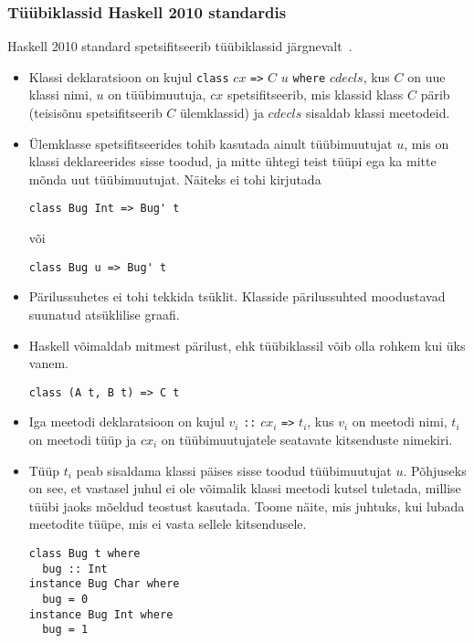\documentclass[12pt]{article}
\begin{document}
      \subsubsection{Tüübiklassid Haskell 2010 standardis}\label{haskstd}
        Haskell 2010 standard spetsifitseerib tüübiklassid järgnevalt~\cite{Has}.
        \begin{itemize}
          \item
            Klassi deklaratsioon on kujul \verb!class! $cx$ \verb!=>! $C$ $u$ \verb!where! $cdecls$, kus $C$ on uue klassi nimi, $u$ on tüübimuutuja, $cx$ spetsifitseerib, mis klassid klass $C$ pärib (teisisõnu spetsifitseerib $C$ ülemklassid) ja $cdecls$ sisaldab klassi meetodeid.
          \item
            Ülemklasse spetsifitseerides tohib kasutada ainult tüübimuutujat $u$, mis on klassi deklareerides sisse toodud, ja mitte ühtegi teist tüüpi ega ka mitte mõnda uut tüübimuutujat. Näiteks ei tohi kirjutada

            \begin{verbatim}class Bug Int => Bug' t\end{verbatim}

            või

            \begin{verbatim}class Bug u => Bug' t\end{verbatim}
          \item
            Pärilussuhetes ei tohi tekkida tsüklit. Klasside pärilussuhted moodustavad suunatud atsüklilise graafi.
          \item
            Haskell võimaldab mitmest pärilust, ehk tüübiklassil võib olla rohkem kui üks vanem.

            \begin{verbatim}class (A t, B t) => C t\end{verbatim}
          \item
            Iga meetodi deklaratsioon on kujul $v_i$ \verb!::! $cx_i$ \verb!=>! $t_i$, kus $v_i$ on meetodi nimi, $t_i$ on meetodi tüüp ja $cx_i$ on tüübimuutujatele seatavate kitsenduste nimekiri.
          \item
            Tüüp $t_i$ peab sisaldama klassi päises sisse toodud tüübimuutujat $u$. Põhjuseks on see, et vastasel juhul ei ole võimalik klassi meetodi kutsel tuletada, millise tüübi jaoks mõeldud teostust kasutada. Toome näite, mis juhtuks, kui lubada meetodite tüüpe, mis ei vasta sellele kitsendusele.

            \begin{verbatim}class Bug t where
  bug :: Int
instance Bug Char where
  bug = 0
instance Bug Int where
  bug = 1\end{verbatim}


\end{itemize}
\end{document}
